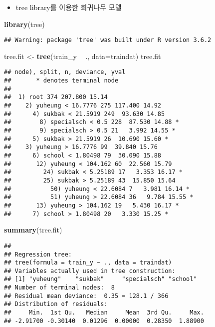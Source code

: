 \documentclass[]{article}
\newenvironment{Shaded}{\begin{snugshade}}{\end{snugshade}}
\newcommand{\DataTypeTok}[1]{\textcolor[rgb]{0.13,0.29,0.53}{#1}}
\newcommand{\KeywordTok}[1]{\textcolor[rgb]{0.13,0.29,0.53}{\textbf{#1}}}
\newcommand{\NormalTok}[1]{#1}
\newcommand{\OperatorTok}[1]{\textcolor[rgb]{0.81,0.36,0.00}{\textbf{#1}}}
\newcommand{\StringTok}[1]{\textcolor[rgb]{0.31,0.60,0.02}{#1}}
\providecommand{\tightlist}{%
  \setlength{\itemsep}{0pt}\setlength{\parskip}{0pt}}
\begin{document}
\begin{itemize}
\tightlist
\item
  tree library를 이용한 회귀나무 모델
\end{itemize}

\begin{Shaded}
\begin{Highlighting}[]
\KeywordTok{library}\NormalTok{(tree)}
\end{Highlighting}
\end{Shaded}

\begin{verbatim}
## Warning: package 'tree' was built under R version 3.6.2
\end{verbatim}

\begin{Shaded}
\begin{Highlighting}[]
\NormalTok{tree.fit <-}\StringTok{ }\KeywordTok{tree}\NormalTok{(train_y }\OperatorTok{~}\StringTok{ }\NormalTok{., }\DataTypeTok{data=}\NormalTok{traindat)    }
\NormalTok{tree.fit}
\end{Highlighting}
\end{Shaded}

\begin{verbatim}
## node), split, n, deviance, yval
##       * denotes terminal node
## 
##  1) root 374 207.800 15.14  
##    2) yuheung < 16.7776 275 117.400 14.92  
##      4) sukbak < 21.5919 249  93.630 14.85  
##        8) specialsch < 0.5 228  87.530 14.88 *
##        9) specialsch > 0.5 21   3.992 14.55 *
##      5) sukbak > 21.5919 26  10.690 15.60 *
##    3) yuheung > 16.7776 99  39.840 15.76  
##      6) school < 1.80498 79  30.090 15.88  
##       12) yuheung < 104.162 60  22.560 15.79  
##         24) sukbak < 5.25189 17   3.353 16.17 *
##         25) sukbak > 5.25189 43  15.850 15.64  
##           50) yuheung < 22.6084 7   3.981 16.14 *
##           51) yuheung > 22.6084 36   9.784 15.55 *
##       13) yuheung > 104.162 19   5.430 16.17 *
##      7) school > 1.80498 20   3.330 15.25 *
\end{verbatim}

\begin{Shaded}
\begin{Highlighting}[]
\KeywordTok{summary}\NormalTok{(tree.fit)}
\end{Highlighting}
\end{Shaded}

\begin{verbatim}
## 
## Regression tree:
## tree(formula = train_y ~ ., data = traindat)
## Variables actually used in tree construction:
## [1] "yuheung"    "sukbak"     "specialsch" "school"    
## Number of terminal nodes:  8 
## Residual mean deviance:  0.35 = 128.1 / 366 
## Distribution of residuals:
##     Min.  1st Qu.   Median     Mean  3rd Qu.     Max. 
## -2.91700 -0.30140  0.01296  0.00000  0.28350  1.88900
\end{verbatim}
\end{document}
